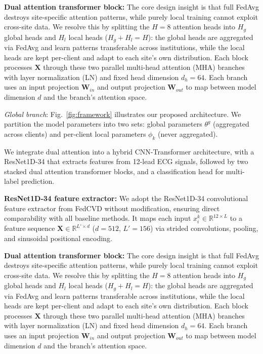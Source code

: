 \documentclass[conference]{IEEEtran}
\begin{document}
{\textbf{Dual attention transformer block:}
The core design insight is that full FedAvg destroys site-specific attention patterns, while purely local training cannot exploit cross-site data. We resolve this by splitting the $H\!=\!8$ attention heads into $H_g$ global heads and $H_l$ local heads ($H_g + H_l = H$): the global heads are aggregated via FedAvg and learn patterns transferable across institutions, while the local heads are kept per-client and adapt to each site's own distribution. Each block processes $\mathbf{X}$ through these two parallel multi-head attention (MHA) branches with layer normalization (LN) and fixed head dimension $d_h=64$. Each branch uses an input projection $\mathbf{W}_{in}$ and output projection $\mathbf{W}_{out}$ to map between model dimension $d$ and the branch's attention space.

\emph{Global branch}:
Fig.~\ref{fig:framework} illustrates our proposed architecture. We partition the model parameters into two sets: global parameters $\theta^g$ (aggregated across clients) and per-client local parameters $\phi_k$ (never aggregated).

We integrate dual attention into a hybrid CNN-Transformer architecture, with a ResNet1D-34 that extracts features from 12-lead ECG signals, followed by two stacked dual attention transformer blocks, and a classification head for multi-label prediction.

\textbf{ResNet1D-34 feature extractor:}
We adopt the ResNet1D-34 convolutional feature extractor from FedCVD without modification, ensuring direct comparability with all baseline methods. It maps each input $x_i^k \in \mathbb{R}^{12 \times L}$ to a feature sequence $\mathbf{X} \in \mathbb{R}^{L' \times d}$ ($d=512$, $L'= 156$) via strided convolutions, pooling, and sinusoidal positional encoding.

\textbf{Dual attention transformer block:}
The core design insight is that full FedAvg destroys site-specific attention patterns, while purely local training cannot exploit cross-site data. We resolve this by splitting the $H\!=\!8$ attention heads into $H_g$ global heads and $H_l$ local heads ($H_g + H_l = H$): the global heads are aggregated via FedAvg and learn patterns transferable across institutions, while the local heads are kept per-client and adapt to each site's own distribution. Each block processes $\mathbf{X}$ through these two parallel multi-head attention (MHA) branches with layer normalization (LN) and fixed head dimension $d_h=64$. Each branch uses an input projection $\mathbf{W}_{in}$ and output projection $\mathbf{W}_{out}$ to map between model dimension $d$ and the branch's attention space.

}
\end{document}
